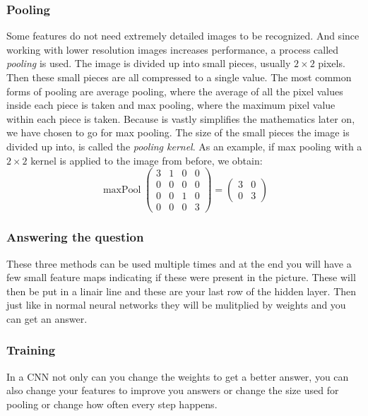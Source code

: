 \documentclass[12pt, titlepage]{article}
\begin{document}
    \subsubsection{Pooling}
    Some features do not need extremely detailed images to be recognized. And since working with lower resolution images increases performance, a process called \textit{pooling} is used. The image is divided up into small pieces, usually $2\times 2$ pixels. Then these small pieces are all compressed to a single value. The most common forms of pooling are average pooling, where the average of all the pixel values inside each piece is taken and max pooling, where the maximum pixel value within each piece is taken. Because is vastly simplifies the mathematics later on, we have chosen to go for max pooling. The size of the small pieces the image is divided up into, is called the \textit{pooling kernel}. As an example, if max pooling with a $2\times 2$ kernel is applied to the image from before, we obtain:
    \begin{equation*}
    \operatorname{maxPool}\begin{pmatrix}
    3 &1 &0 &0\\
    0 & 0 & 0 &0\\
    0 &0 &1 &0\\
    0 &0 &0 &3
    \end{pmatrix} = \begin{pmatrix}
    3 &0\\
    0 &3
    \end{pmatrix}
    \end{equation*}
    
    \subsubsection{Answering the question}
    These three methods can be used multiple times and at the end you will have a few small feature maps indicating if these were present in the picture. These will then be put in a linair line and these are your last row of the hidden layer. Then just like in normal neural networks they will be mulitplied by weights and you can get an answer.
    
    \subsubsection{Training}
    In a CNN not only can you change the weights to get a better answer, you can also change your features to improve you answers or change the size used for pooling or change how often every step happens.
    
\end{document}
